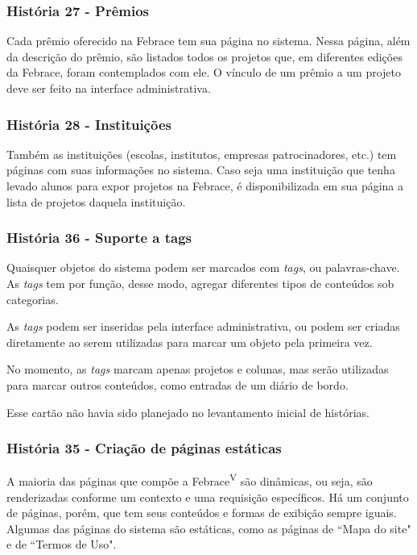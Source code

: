 \documentclass[a4paper,12pt,font=plain,header=plain]{abnt}
\begin{document}
    \subsubsection{História 27 - Prêmios}
      Cada prêmio oferecido na Febrace tem sua página no sistema. Nessa página, além da descrição do prêmio, são listados todos os projetos que, em diferentes edições da Febrace, foram contemplados com ele. O vínculo de um prêmio a um projeto deve ser feito na interface administrativa.

    \subsubsection{História 28 - Instituições}
      Também as instituições (escolas, institutos, empresas patrocinadores, etc.) tem páginas com suas informações no sistema. Caso seja uma instituição que tenha levado alunos para expor projetos na Febrace, é disponibilizada em sua página a lista de projetos daquela instituição.

    \subsubsection{História 36 - Suporte a tags}
      Quaisquer objetos do sistema podem ser marcados com \textit{tags}, ou palavras-chave. As \textit{tags} tem por função, desse modo, agregar diferentes tipos de conteúdos sob categorias.

      As \textit{tags} podem ser inseridas pela interface administrativa, ou podem ser criadas diretamente ao serem utilizadas para marcar um objeto pela primeira vez.

      No momento, as \textit{tags} marcam apenas projetos e colunas, mas serão utilizadas para marcar outros conteúdos, como entradas de um diário de bordo.

  Esse cartão não havia sido planejado no levantamento inicial de histórias.

    \subsubsection{História 35 - Criação de páginas estáticas}
      A maioria das páginas que compõe a Febrace\textsuperscript{V} são dinâmicas, ou seja, são renderizadas conforme um contexto e uma requisição específicos. Há um conjunto de páginas, porém, que tem seus conteúdos e formas de exibição sempre iguais. Algumas das páginas do sistema são estáticas, como as páginas de “Mapa do site" e de “Termos de Uso".
\end{document}
